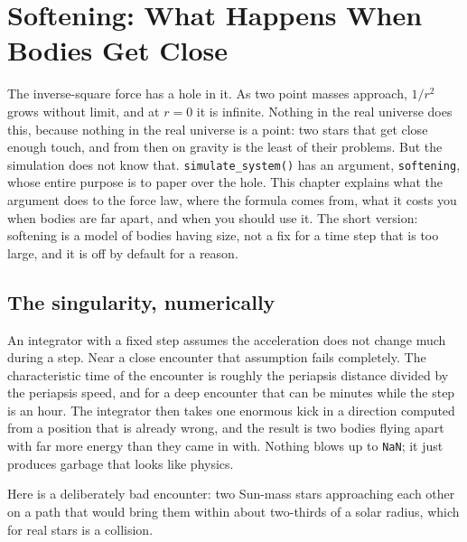 \documentclass[
  10.5pt,
  letterpaper,
]{scrbook}
\theoremstyle{definition}
\theoremstyle{plain}
\theoremstyle{remark}
\begin{document}
\chapter{Softening: What Happens When Bodies Get
Close}\label{sec-softening}

The inverse-square force has a hole in it. As two point masses approach,
\(1/r^2\) grows without limit, and at \(r = 0\) it is infinite. Nothing
in the real universe does this, because nothing in the real universe is
a point: two stars that get close enough touch, and from then on gravity
is the least of their problems. But the simulation does not know that.
\texttt{simulate\_system()} has an argument, \texttt{softening}, whose
entire purpose is to paper over the hole. This chapter explains what the
argument does to the force law, where the formula comes from, what it
costs you when bodies are far apart, and when you should use it. The
short version: softening is a model of bodies having size, not a fix for
a time step that is too large, and it is off by default for a reason.

\section{The singularity,
numerically}\label{the-singularity-numerically}

An integrator with a fixed step assumes the acceleration does not change
much during a step. Near a close encounter that assumption fails
completely. The characteristic time of the encounter is roughly the
periapsis distance divided by the periapsis speed, and for a deep
encounter that can be minutes while the step is an hour. The integrator
then takes one enormous kick in a direction computed from a position
that is already wrong, and the result is two bodies flying apart with
far more energy than they came in with. Nothing blows up to
\texttt{NaN}; it just produces garbage that looks like physics.

Here is a deliberately bad encounter: two Sun-mass stars approaching
each other on a path that would bring them within about two-thirds of a
solar radius, which for real stars is a collision.
\end{document}
